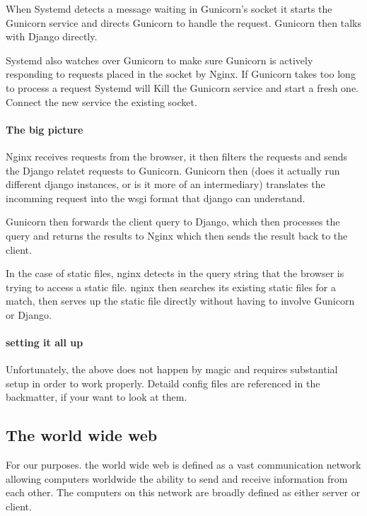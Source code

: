 {When Systemd detects a message waiting in Gunicorn's socket it starts the Gunicorn service and directs Gunicorn to handle the request.  Gunicorn then talks with Django directly.

Systemd also watches over Gunicorn to make sure Gunicorn is actively responding to requests placed in the socket by Nginx.  If Gunicorn takes too long to process a request Systemd will Kill the Gunicorn service and start a fresh one.  Connect the new service the existing socket.

\paragraph{The big picture}

  Nginx receives requests from the browser, it then filters the requests and sends the Django relatet requests to Gunicorn.  Gunicorn then (does it actually run different django instances, or is it more of an intermediary) translates the incomming request into the wsgi format that django can understand.
  
  Gunicorn then forwards the client query to Django, which then processes the query and returns the results to Nginx which then sends the result back to the client.
  
  In the case of static files, nginx detects in the query string that the browser is trying to access a static file.  nginx then searches its existing static files for a match, then serves up the static file directly without having to involve Gunicorn or Django.
  
\paragraph{setting it all up}

  Unfortunately, the above does not happen by magic and requires substantial setup in order to work properly.  Detaild config files are referenced in the backmatter, if your want to look at them.


\subsection{The world wide web}

For our purposes. the world wide web is defined as a vast communication network allowing computers worldwide the ability to send and receive information from each other.  The computers on this network are broadly defined as either server or client.

}

